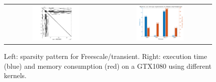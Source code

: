 \begin{figure}[t]
\begin{center}
\begin{tabular}{cc}
\includegraphics[width=0.48\textwidth]{plots/pattern.pdf} &
\includegraphics[width=0.48\textwidth]{plots/motivation.pdf}
\end{tabular}
\end{center}
\vspace*{-2ex}
    \caption{Left: sparsity pattern for {\sc Freescale/transient}.
    Right: execution time (blue) and memory consumption (red) on a GTX1080
    using different \spmv kernels.}
\label{2017-csr-spmv:fig:motivation}
\end{figure}

